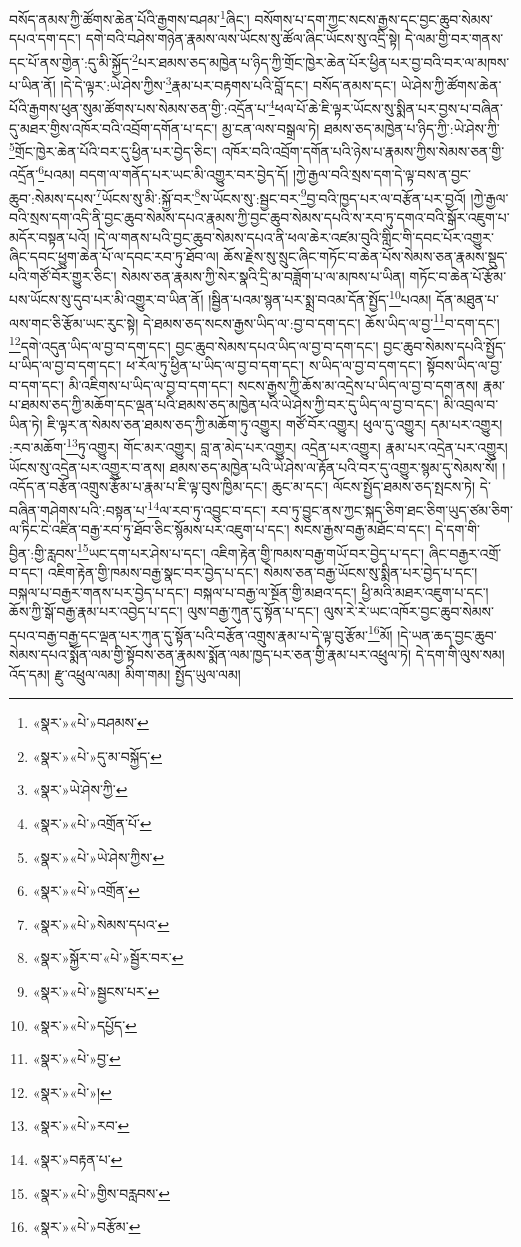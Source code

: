 བསོད་ནམས་ཀྱི་ཚོགས་ཆེན་པོའི་རྒྱགས་བཤམ་\footnote{«སྣར་»«པེ་»བཤམས་}ཞིང་། བསོགས་པ་དག་ཀྱང་སངས་རྒྱས་དང་བྱང་ཆུབ་སེམས་དཔའ་དག་དང་། དགེ་བའི་བཤེས་གཉེན་རྣམས་ལས་ཡོངས་སུ་ཚོལ་ཞིང་ཡོངས་སུ་འདྲི་སྟེ། དེ་ལམ་གྱི་བར་གནས་དང་པོ་ནས་གྱེན་:དུ་མི་སྐྱོད་\footnote{«སྣར་»«པེ་»དུ་མ་བསྐྱོད་}པར་ཐམས་ཅད་མཁྱེན་པ་ཉིད་ཀྱི་གྲོང་ཁྱེར་ཆེན་པོར་ཕྱིན་པར་བྱ་བའི་བར་ལ་མཁས་པ་ཡིན་ནོ། །དེ་དེ་ལྟར་:ཡེ་ཤེས་ཀྱིས་\footnote{«སྣར་»ཡེ་ཤེས་ཀྱི་}རྣམ་པར་བརྟགས་པའི་བློ་དང་། བསོད་ནམས་དང་། ཡེ་ཤེས་ཀྱི་ཚོགས་ཆེན་པོའི་རྒྱགས་ཕུན་སུམ་ཚོགས་པས་སེམས་ཅན་གྱི་:འདྲོན་པ་\footnote{«སྣར་»«པེ་»འགྲོན་པོ་}ཕལ་པོ་ཆེ་ཇི་ལྟར་ཡོངས་སུ་སྨིན་པར་བྱས་པ་བཞིན་དུ་མཐར་གྱིས་འཁོར་བའི་འབྲོག་དགོན་པ་དང་། མྱ་ངན་ལས་བསྒྲལ་ཏེ། ཐམས་ཅད་མཁྱེན་པ་ཉིད་ཀྱི་:ཡེ་ཤེས་ཀྱི་\footnote{«སྣར་»«པེ་»ཡེ་ཤེས་ཀྱིས་}གྲོང་ཁྱེར་ཆེན་པོའི་བར་དུ་ཕྱིན་པར་བྱེད་ཅིང་། འཁོར་བའི་འབྲོག་དགོན་པའི་ཉེས་པ་རྣམས་ཀྱིས་སེམས་ཅན་གྱི་འདྲོན་\footnote{«སྣར་»«པེ་»འགྲོན་}པའམ། བདག་ལ་གནོད་པར་ཡང་མི་འགྱུར་བར་བྱེད་དོ། །ཀྱེ་རྒྱལ་བའི་སྲས་དག་དེ་ལྟ་བས་ན་བྱང་ཆུབ་:སེམས་དཔས་\footnote{«སྣར་»«པེ་»སེམས་དཔའ་}ཡོངས་སུ་མི་:སྐྱོ་བར་\footnote{«སྣར་»སྐྱོར་བ་«པེ་»སྦྱོར་བར་}ས་ཡོངས་སུ་:སྦྱང་བར་\footnote{«སྣར་»«པེ་»སྦྱངས་པར་}བྱ་བའི་ཁྱད་པར་ལ་བརྩོན་པར་བྱའོ། །ཀྱེ་རྒྱལ་བའི་སྲས་དག་འདི་ནི་བྱང་ཆུབ་སེམས་དཔའ་རྣམས་ཀྱི་བྱང་ཆུབ་སེམས་དཔའི་ས་རབ་ཏུ་དགའ་བའི་སྒོར་འཇུག་པ་མདོར་བསྟན་པའོ། །དེ་ལ་གནས་པའི་བྱང་ཆུབ་སེམས་དཔའ་ནི་ཕལ་ཆེར་འཛམ་བུའི་གླིང་གི་དབང་པོར་འགྱུར་ཞིང་དབང་ཕྱུག་ཆེན་པོ་ལ་དབང་རབ་ཏུ་ཐོབ་ལ། ཆོས་རྗེས་སུ་སྲུང་ཞིང་གཏོང་བ་ཆེན་པོས་སེམས་ཅན་རྣམས་སྡུད་པའི་གཙོ་བོར་གྱུར་ཅིང་། སེམས་ཅན་རྣམས་ཀྱི་སེར་སྣའི་དྲི་མ་བཟློག་པ་ལ་མཁས་པ་ཡིན། གཏོང་བ་ཆེན་པོ་རྩོམ་པས་ཡོངས་སུ་དུབ་པར་མི་འགྱུར་བ་ཡིན་ནོ། །སྦྱིན་པའམ་སྙན་པར་སྨྲ་བའམ་དོན་སྤྱོད་\footnote{«སྣར་»«པེ་»དཔྱོད་}པའམ། དོན་མཐུན་པ་ལས་གང་ཅི་རྩོམ་ཡང་རུང་སྟེ། དེ་ཐམས་ཅད་སངས་རྒྱས་ཡིད་ལ་:བྱ་བ་དག་དང་། ཆོས་ཡིད་ལ་བྱ་\footnote{«སྣར་»«པེ་»བྱ་}བ་དག་དང་། \footnote{«སྣར་»«པེ་»།  }དགེ་འདུན་ཡིད་ལ་བྱ་བ་དག་དང་། བྱང་ཆུབ་སེམས་དཔའ་ཡིད་ལ་བྱ་བ་དག་དང་། བྱང་ཆུབ་སེམས་དཔའི་སྤྱོད་པ་ཡིད་ལ་བྱ་བ་དག་དང་། ཕ་རོལ་ཏུ་ཕྱིན་པ་ཡིད་ལ་བྱ་བ་དག་དང་། ས་ཡིད་ལ་བྱ་བ་དག་དང་། སྟོབས་ཡིད་ལ་བྱ་བ་དག་དང་། མི་འཇིགས་པ་ཡིད་ལ་བྱ་བ་དག་དང་། སངས་རྒྱས་ཀྱི་ཆོས་མ་འདྲེས་པ་ཡིད་ལ་བྱ་བ་དག་ནས། རྣམ་པ་ཐམས་ཅད་ཀྱི་མཆོག་དང་ལྡན་པའི་ཐམས་ཅད་མཁྱེན་པའི་ཡེ་ཤེས་ཀྱི་བར་དུ་ཡིད་ལ་བྱ་བ་དང་། མི་འབྲལ་བ་ཡིན་ཏེ། ཇི་ལྟར་ན་སེམས་ཅན་ཐམས་ཅད་ཀྱི་མཆོག་ཏུ་འགྱུར། གཙོ་བོར་འགྱུར། ཕུལ་དུ་འགྱུར། དམ་པར་འགྱུར། :རབ་མཆོག་\footnote{«སྣར་»«པེ་»རབ་}ཏུ་འགྱུར། གོང་མར་འགྱུར། བླ་ན་མེད་པར་འགྱུར། འདྲེན་པར་འགྱུར། རྣམ་པར་འདྲེན་པར་འགྱུར། ཡོངས་སུ་འདྲེན་པར་འགྱུར་བ་ནས། ཐམས་ཅད་མཁྱེན་པའི་ཡེ་ཤེས་ལ་རྟོན་པའི་བར་དུ་འགྱུར་སྙམ་དུ་སེམས་སོ། །འདོད་ན་བརྩོན་འགྲུས་རྩོམ་པ་རྣམ་པ་ཇི་ལྟ་བུས་ཁྱིམ་དང་། ཆུང་མ་དང་། ལོངས་སྤྱོད་ཐམས་ཅད་སྤངས་ཏེ། དེ་བཞིན་གཤེགས་པའི་:བསྟན་པ་\footnote{«སྣར་»བརྟན་པ་}ལ་རབ་ཏུ་འབྱུང་བ་དང་། རབ་ཏུ་བྱུང་ནས་ཀྱང་སྐད་ཅིག་ཐང་ཅིག་ཡུད་ཙམ་ཅིག་ལ་ཏིང་ངེ་འཛིན་བརྒྱ་རབ་ཏུ་ཐོབ་ཅིང་སྙོམས་པར་འཇུག་པ་དང་། སངས་རྒྱས་བརྒྱ་མཐོང་བ་དང་། དེ་དག་གི་བྱིན་:གྱི་རླབས་\footnote{«སྣར་»«པེ་»གྱིས་བརླབས་}ཡང་དག་པར་ཤེས་པ་དང་། འཇིག་རྟེན་གྱི་ཁམས་བརྒྱ་གཡོ་བར་བྱེད་པ་དང་། ཞིང་བརྒྱར་འགྲོ་བ་དང་། འཇིག་རྟེན་གྱི་ཁམས་བརྒྱ་སྣང་བར་བྱེད་པ་དང་། སེམས་ཅན་བརྒྱ་ཡོངས་སུ་སྨིན་པར་བྱེད་པ་དང་། བསྐལ་པ་བརྒྱར་གནས་པར་བྱེད་པ་དང་། བསྐལ་པ་བརྒྱ་ལ་སྔོན་གྱི་མཐའ་དང་། ཕྱི་མའི་མཐར་འཇུག་པ་དང་། ཆོས་ཀྱི་སྒོ་བརྒྱ་རྣམ་པར་འབྱེད་པ་དང་། ལུས་བརྒྱ་ཀུན་དུ་སྟོན་པ་དང་། ལུས་རེ་རེ་ཡང་འཁོར་བྱང་ཆུབ་སེམས་དཔའ་བརྒྱ་བརྒྱ་དང་ལྡན་པར་ཀུན་དུ་སྟོན་པའི་བརྩོན་འགྲུས་རྣམ་པ་དེ་ལྟ་བུ་རྩོམ་\footnote{«སྣར་»«པེ་»བརྩོམ་}མོ། །དེ་ཡན་ཆད་བྱང་ཆུབ་སེམས་དཔའ་སྨོན་ལམ་གྱི་སྟོབས་ཅན་རྣམས་སྨོན་ལམ་ཁྱད་པར་ཅན་གྱི་རྣམ་པར་འཕྲུལ་ཏེ། དེ་དག་གི་ལུས་སམ། འོད་དམ། རྫུ་འཕྲུལ་ལམ། མིག་གམ། སྤྱོད་ཡུལ་ལམ། 